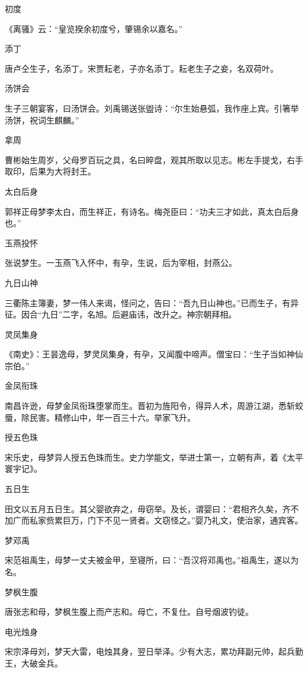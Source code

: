 \documentclass[a4paper,12pt,UTF8,twoside]{ctexbook}
\begin{document}
    初度
    
    《离骚》云：“皇览揆余初度兮，肇锡余以嘉名。”
    
    添丁
    
    唐卢仝生子，名添丁。宋贾耘老，子亦名添丁。耘老生子之妾，名双荷叶。
    
    汤饼会
    
    生子三朝宴客，曰汤饼会。刘禹锡送张盥诗：“尔生始悬弧，我作座上宾。引箸举汤饼，祝词生麒麟。”
    
    拿周
    
    曹彬始生周岁，父母罗百玩之具，名曰晬盘，观其所取以见志。彬左手提戈，右手取印，后果为大将封王。
    
    太白后身
    
    郭祥正母梦李太白，而生祥正，有诗名。梅尧臣曰：“功夫三才如此，真太白后身也。”
    
    玉燕投怀
    
    张说梦生。一玉燕飞入怀中，有孕，生说，后为宰相，封燕公。
    
    九日山神
    
    三衢陈主簿妻，梦一伟人来谒，怪问之，告曰：“吾九日山神也。”已而生子，有异征。因合“九日”二字，名旭。后避庙讳，改升之。神宗朝拜相。
    
    灵凤集身
    
    《南史》：王昙逸母，梦灵凤集身，有孕，又闻腹中啼声。僧宝曰：“生子当如神仙宗伯。”
    
    金凤衔珠
    
    南昌许逊，母梦金凤衔珠堕掌而生。晋初为旌阳令，得异人术，周游江湖，悉斩蛟蜃，除民害。精修山中，年一百三十六。举家飞升。
    
    授五色珠
    
    宋乐史，母梦异人授五色珠而生。史力学能文，举进士第一，立朝有声，着《太平寰宇记》。
    
    五日生
    
    田文以五月五日生。其父婴欲弃之，毋窃举。及长，谓婴曰：“君相齐久矣，齐不加广而私家赀累巨万，门下不见一贤者。文窃怪之。”婴乃礼文，使治家，通宾客。
    
    梦邓禹
    
    宋范祖禹生，母梦一丈夫被金甲，至寝所，曰：“吾汉将邓禹也。”祖禹生，遂以为名。
    
    梦枫生腹
    
    唐张志和母，梦枫生腹上而产志和。母亡，不复仕。自号烟波钓徒。
    
    电光烛身
    
    宋宗泽母刘，梦天大雷，电烛其身，翌日举泽。少有大志，累功拜副元帅，起兵勤王，大破金兵。
    
\end{document}
